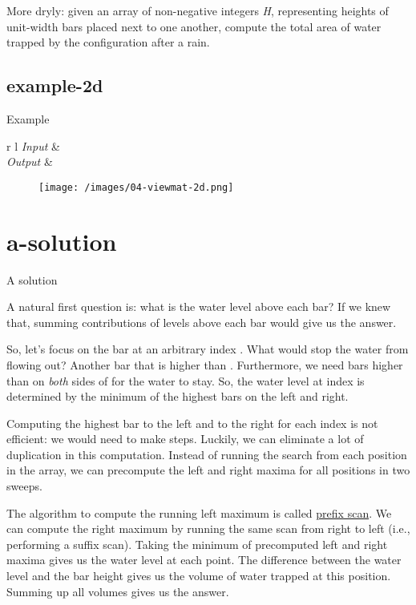 \documentclass{article}
\begin{document}
More dryly: given an array of non-negative integers \emph{H}, representing heights of unit-width bars placed next to one another, compute the total area of water trapped by the configuration after a rain.

\subsection{example-2d}{Example}
\begin{tabular*}{r l}
    \emph{Input} &  \\
    \emph{Output} &  \\
\end{tabular*}

\newline

\begin{figure}
  \texttt{[image: /images/04-viewmat-2d.png]}
\end{figure}

\section{a-solution}{A solution}

A natural first question is: what is the water level above each bar?
If we knew that, summing contributions of levels above each bar would give us the answer.

So, let's focus on the bar at an arbitrary index .
What would stop the water from flowing out?
Another bar that is higher than .
Furthermore, we need bars higher than  on \emph{both} sides of  for the water to stay.
So, the water level at index  is determined by the minimum of the highest bars on the left and right.

Computing the highest bar to the left and to the right for each index is not efficient: we would need to make  steps.
Luckily, we can eliminate a lot of duplication in this computation.
Instead of running the search from each position in the array, we can precompute the left and right maxima for all positions in two sweeps.

The algorithm to compute the running left maximum is called \href{https://en.wikipedia.org/wiki/Prefix_sum}{prefix scan}.
We can compute the right maximum by running the same scan from right to left (i.e., performing a suffix scan).
Taking the minimum of precomputed left and right maxima gives us the water level at each point.
The difference between the water level and the bar height gives us the volume of water trapped at this position.
Summing up all volumes gives us the answer.
\end{document}
